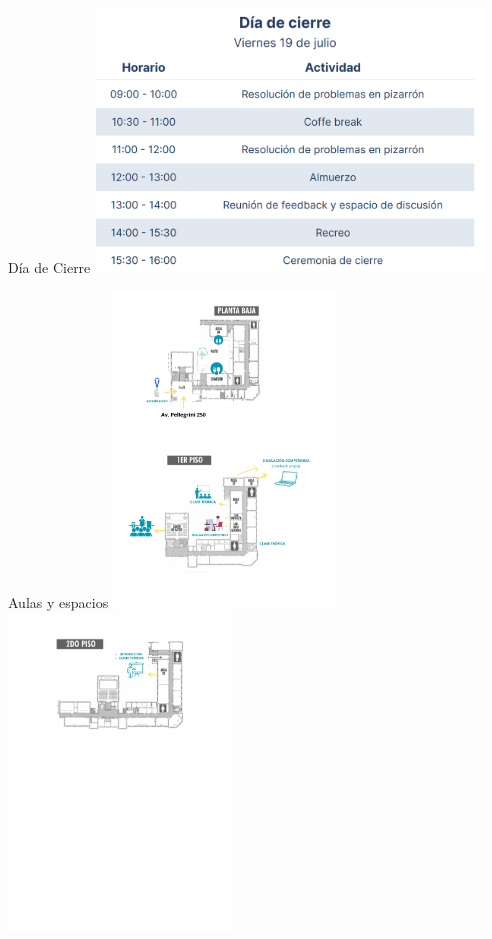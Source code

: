 \documentclass{beamer}
\begin{document}
\begin{frame}{Día de Cierre}
    \centering
    \includegraphics[clip,height=7cm,keepaspectratio]{img/04_cierre.png}
\end{frame}

\begin{frame}{Aulas y espacios}
    \centering
    \includegraphics[clip,height=8.4cm,keepaspectratio]{img/mapa_00.jpeg}
    \includegraphics[clip,height=8.4cm,keepaspectratio]{img/mapa_01.jpeg}
\end{frame}
\end{document}
